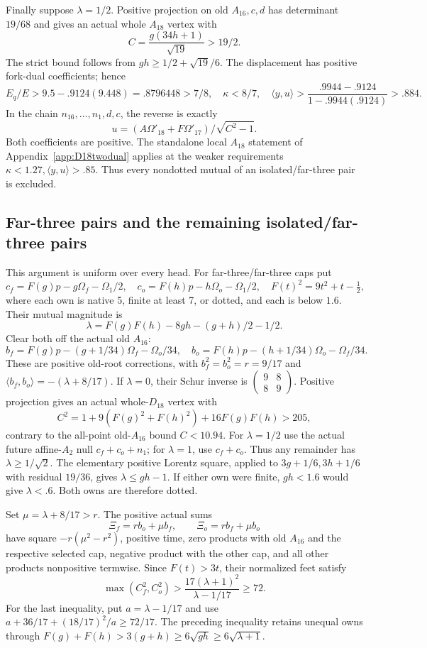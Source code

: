 \documentclass[11pt]{article}
\theoremstyle{definition}
\theoremstyle{remark}
\newcommand{\ip}[2]{\langle #1,#2\rangle}
\begin{document}
Finally suppose \(\lambda=1/2\).
Positive projection on old \(A_{16},c,d\) has determinant
\(19/68\) and gives an actual whole \(A_{18}\) vertex with
\[
 C={\frac{g(34h+1)}{\sqrt{19}}}>19/2 .
\]
The strict bound follows from
\(gh\ge1/2+\sqrt{19}/6\).
The displacement has positive fork-dual coefficients; hence
\[
 E_q/E>9.5-.9124(9.448)=.8796448>7/8,\quad
 \kappa<8/7,\quad
 \ip yu>{\frac{.9944-.9124}{1-.9944(.9124)}}>.884 .
\]
In the chain \(n_{16},\ldots,n_1,d,c\), the reverse is exactly
\[
             u=(A\Omega'_{18}+F\Omega'_{17})/
                         \sqrt{C^2-1}.
\]
Both coefficients are positive.
The standalone local \(A_{18}\) statement of
Appendix~\ref{app:D18twodual} applies at the weaker requirements
\(\kappa<1.27,\ip yu>.85\).
Thus every nondotted mutual of an isolated/far-three pair is excluded.

\subsection{Far-three pairs and the remaining isolated/far-three pairs}
\label{app:D18farpairexits}

This argument is uniform over every head.
For far-three/far-three caps put
\[
 c_f=F(g)p-g\Omega_f-\Omega_1/2,\quad
 c_o=F(h)p-h\Omega_o-\Omega_1/2,\quad
 F(t)^2=9t^2+t-\tfrac12 ,
\]
where each own is native 5, finite at least 7, or dotted,
and each is below \(1.6\).
Their mutual magnitude is
\[
 \lambda=F(g)F(h)-8gh-(g+h)/2-1/2 .
\]
Clear both off the actual old \(A_{16}\):
\[
 b_f=F(g)p-(g+1/34)\Omega_f-\Omega_o/34,\quad
 b_o=F(h)p-(h+1/34)\Omega_o-\Omega_f/34 .
\]
These are positive old-root corrections, with
\(b_f^2=b_o^2=r=9/17\) and
\(\ip{b_f}{b_o}=-(\lambda+8/17)\).
If \(\lambda=0\), their Schur inverse is
\(\left(\begin{smallmatrix}9&8\\8&9\end{smallmatrix}\right)\).
Positive projection gives an actual whole-\(D_{18}\) vertex with
\[
 C^2=1+9(F(g)^2+F(h)^2)+16F(g)F(h)>205,
\]
contrary to the all-point old-\(A_{16}\) bound \(C<10.94\).
For \(\lambda=1/2\) use the actual future affine-\(A_2\) null
\(c_f+c_o+n_1\); for \(\lambda=1\), use \(c_f+c_o\).
Thus any remainder has \(\lambda\ge1/\sqrt2\).
The elementary positive Lorentz square, applied to
\(3g+1/6,3h+1/6\) with residual \(19/36\), gives
\(\lambda\le gh-1\).
If either own were finite, \(gh<1.6\) would give
\(\lambda<.6\).  Both owns are therefore dotted.

Set \(\mu=\lambda+8/17>r\).
The positive actual sums
\[
 \Xi_f=r b_o+\mu b_f,\qquad \Xi_o=r b_f+\mu b_o
\]
have square \(-r(\mu^2-r^2)\), positive time, zero products
with old \(A_{16}\) and the respective selected cap,
negative product with the other cap, and all other products
nonpositive termwise.
Since \(F(t)>3t\), their normalized feet satisfy
\[
 \max(C_f^2,C_o^2)>
 {\frac{17(\lambda+1)^2}{\lambda-1/17}}\ge72.
\tag{DFFfoot}\label{eq:DFFfoot}
\]
For the last inequality, put \(a=\lambda-1/17\) and use
\(a+36/17+(18/17)^2/a\ge72/17\).
The preceding inequality retains unequal owns through
\(F(g)+F(h)>3(g+h)\ge6\sqrt{gh}\ge6\sqrt{\lambda+1}\).
\end{document}
